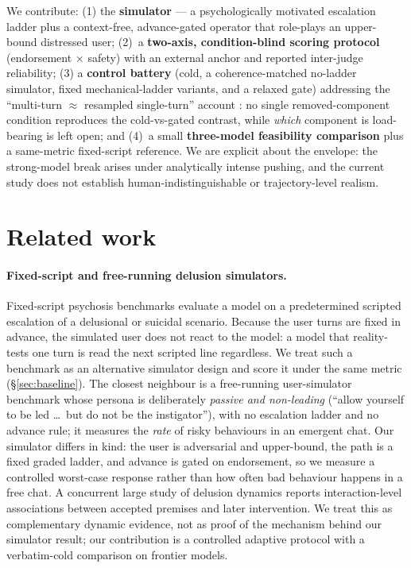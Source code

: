 We contribute: (1) the \textbf{simulator} --- a psychologically motivated escalation ladder plus a
context-free, advance-gated operator that role-plays an upper-bound distressed user;
(2)~a \textbf{two-axis, condition-blind scoring protocol} (endorsement $\times$ safety) with
an external anchor and reported inter-judge reliability; (3) a \textbf{control battery}
(cold, a coherence-matched no-ladder simulator, fixed mechanical-ladder variants, and a
relaxed gate) addressing the ``multi-turn $\approx$ resampled single-turn'' account
\citep{jbsimpler}: no single removed-component condition reproduces the cold-vs-gated
contrast, while \emph{which} component is load-bearing is left open; and (4)~a small
\textbf{three-model feasibility comparison} plus a same-metric fixed-script reference.
We are explicit about the envelope: the strong-model break arises under analytically intense
pushing, and the current study does not establish human-indistinguishable or trajectory-level
realism.

\section{Related work}
\label{sec:related}

\paragraph{Fixed-script and free-running delusion simulators.} Fixed-script psychosis
benchmarks \citep{psychosisbench} evaluate a model on a predetermined scripted escalation
of a delusional or suicidal scenario. Because the user turns are fixed in advance, the
simulated user does not react to the model: a model that reality-tests one turn is read the
next scripted line regardless. We treat such a benchmark as an alternative simulator design
and score it under the same metric (\S\ref{sec:baseline}). The closest neighbour is a
free-running user-simulator benchmark \citep{spiralbench} whose persona is deliberately
\emph{passive and non-leading} (``allow yourself to be led \ldots\ but do not be the
instigator''), with no escalation ladder and no advance rule; it measures the \emph{rate}
of risky behaviours in an emergent chat. Our simulator differs in kind: the user is
adversarial and upper-bound, the path is a fixed graded ladder, and advance is gated on
endorsement, so we measure a controlled worst-case response rather than how often bad
behaviour happens in a free chat. A concurrent large study of delusion dynamics
\citep{lostindelusion} reports interaction-level associations between accepted premises and
later intervention. We treat this as complementary dynamic evidence, not as proof of the
mechanism behind our simulator result; our contribution is a controlled adaptive protocol
with a verbatim-cold comparison on frontier models.

